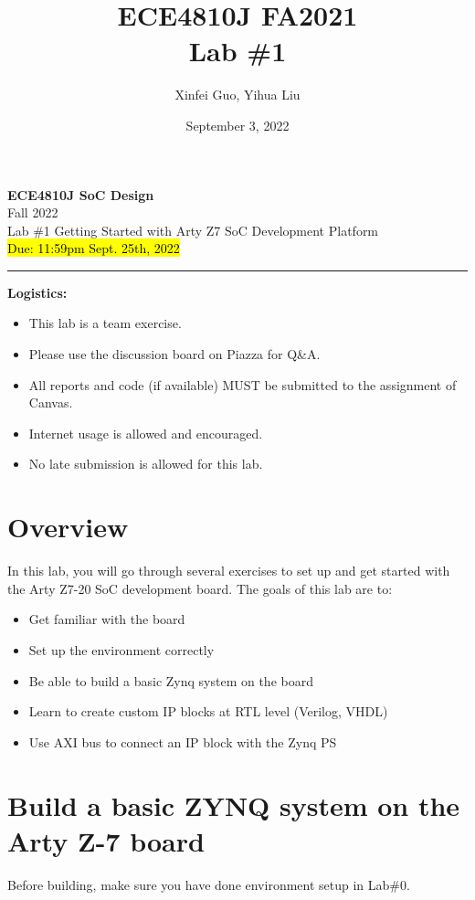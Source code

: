\documentclass[a4paper,12pt,twoside]{article}
\author{Xinfei Guo, Yihua Liu}
\title{ECE4810J FA2021\\ \small Lab \#1}
\date{September 3, 2022}
\begin{document}
\thispagestyle{fancy}

\begin{center}
    \vspace*{0pt}
    \Large{\textbf{ECE4810J SoC Design}}\\
    \vspace*{2pt}
    \large{Fall 2022}\\
    \vspace*{10pt}
    \Large{\textcolor{caption2color}{Lab \#1 Getting Started with Arty Z7 SoC Development Platform}}\\
    \normalsize{\hl{Due: 11:59pm Sept. 25th, 2022}}
    \rule[-5pt]{.97\linewidth}{0.05em}
\end{center}

\textbf{Logistics:}
\begin{itemize}
    \item This lab is a team exercise.
    \item Please use the discussion board on Piazza for Q\&A.
    \item All reports and code (if available) MUST be submitted to the assignment of Canvas.
    \item Internet usage is allowed and encouraged.
    \item No late submission is allowed for this lab.
\end{itemize}
\tableofcontents
\section{Overview}
In this lab, you will go through several exercises to set up and get started with the Arty Z7-20 SoC development board. The goals of this lab are to:
\begin{itemize}
    \item Get familiar with the board
    \item Set up the environment correctly
    \item Be able to build a basic Zynq system on the board
    \item Learn to create custom IP blocks at RTL level (Verilog, VHDL)
    \item Use AXI bus to connect an IP block with the Zynq PS
\end{itemize}
\section{Build a basic ZYNQ system on the Arty Z-7 board}\label{S2}
Before building, make sure you have done environment setup in Lab\#0.
\end{document}
